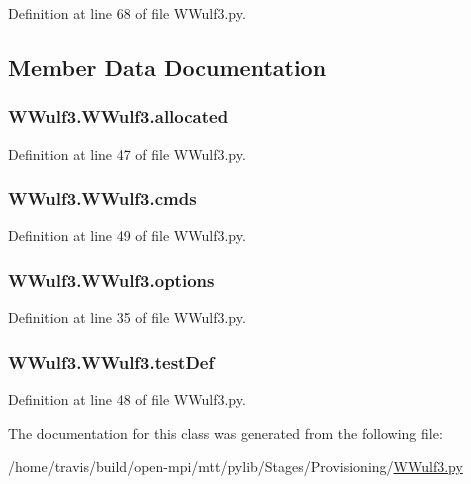 Definition at line 68 of file W\-Wulf3.\-py.



\subsection{Member Data Documentation}
\hypertarget{classWWulf3_1_1WWulf3_ad83bab03cfcdab3a5b689a0958db19e8}{
\subsubsection[{allocated}]{\setlength{\rightskip}{0pt plus 5cm}W\-Wulf3.\-W\-Wulf3.\-allocated}}\label{classWWulf3_1_1WWulf3_ad83bab03cfcdab3a5b689a0958db19e8}


Definition at line 47 of file W\-Wulf3.\-py.

\hypertarget{classWWulf3_1_1WWulf3_afb4fb9db2456e29872155d9b8738418f}{
\subsubsection[{cmds}]{\setlength{\rightskip}{0pt plus 5cm}W\-Wulf3.\-W\-Wulf3.\-cmds}}\label{classWWulf3_1_1WWulf3_afb4fb9db2456e29872155d9b8738418f}


Definition at line 49 of file W\-Wulf3.\-py.

\hypertarget{classWWulf3_1_1WWulf3_adff5ffd43f8b68d49c7b45ab48d7b428}{
\subsubsection[{options}]{\setlength{\rightskip}{0pt plus 5cm}W\-Wulf3.\-W\-Wulf3.\-options}}\label{classWWulf3_1_1WWulf3_adff5ffd43f8b68d49c7b45ab48d7b428}


Definition at line 35 of file W\-Wulf3.\-py.

\hypertarget{classWWulf3_1_1WWulf3_a9e8732432df9211bd64454c4c0e04098}{
\subsubsection[{test\-Def}]{\setlength{\rightskip}{0pt plus 5cm}W\-Wulf3.\-W\-Wulf3.\-test\-Def}}\label{classWWulf3_1_1WWulf3_a9e8732432df9211bd64454c4c0e04098}


Definition at line 48 of file W\-Wulf3.\-py.



The documentation for this class was generated from the following file\-:\begin{DoxyCompactItemize}
\item 
/home/travis/build/open-\/mpi/mtt/pylib/\-Stages/\-Provisioning/\hyperlink{WWulf3_8py}{W\-Wulf3.\-py}\end{DoxyCompactItemize}
